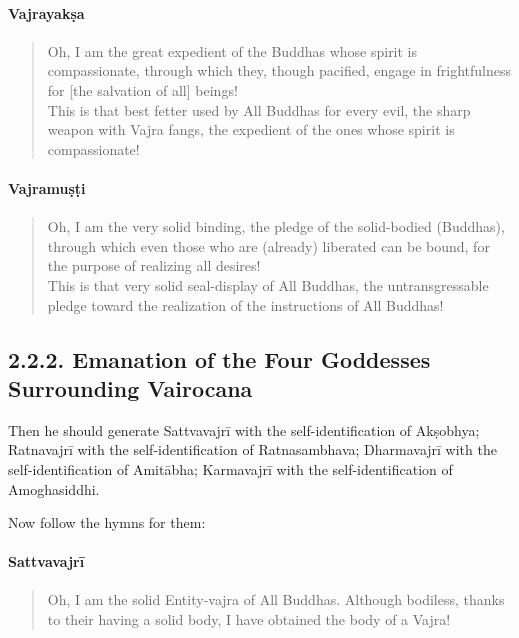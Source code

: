 \documentclass[11pt]{book}
\begin{document}
\paragraph{Vajrayakṣa}

\begin{verse}
Oh, I am the great expedient of the Buddhas whose spirit is compassionate, through which they, though pacified, engage in frightfulness for [the salvation of all] beings!\\
This is that best fetter used by All Buddhas for every evil, the sharp weapon with Vajra fangs, the expedient of the ones whose spirit is compassionate!
\end{verse}

\paragraph{Vajramuṣṭi}

\begin{verse}
Oh, I am the very solid binding, the pledge of the solid-bodied (Buddhas), through which even those who are (already) liberated can be bound, for the purpose of realizing all desires!\\
This is that very solid seal-display of All Buddhas, the untransgressable pledge toward the realization of the instructions of All Buddhas!
\end{verse}

\subsection{2.2.2. Emanation of the Four Goddesses Surrounding Vairocana}

Then he should generate Sattvavajrī with the self-identification of Akṣobhya; Ratnavajrī with the self-identification of Ratnasambhava; Dharmavajrī with the self-identification of Amitābha; Karmavajrī with the self-identification of Amoghasiddhi. 

Now follow the hymns for them:

\paragraph{Sattvavajrī}

\begin{verse}
Oh, I am the solid Entity-vajra of All Buddhas. Although bodiless,  thanks to their having a solid body, I have obtained the body of a Vajra!
\end{verse}
\end{document}
